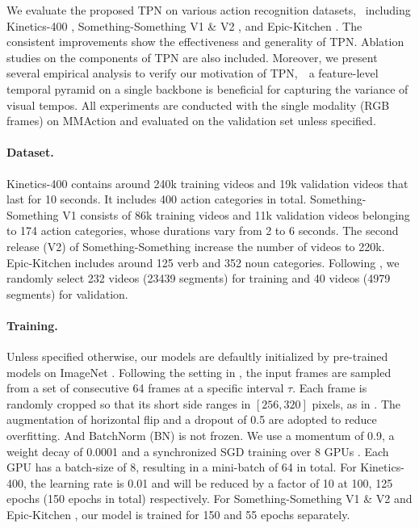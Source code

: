 \documentclass[10pt,twocolumn,letterpaper]{article}
\begin{document}
We evaluate the proposed TPN on various action recognition datasets, \
including Kinetics-400 \cite{kinetics}, Something-Something V1 \& V2 \cite{sthv1}, and Epic-Kitchen \cite{epic}. The consistent improvements show the effectiveness and generality of TPN.
Ablation studies on the components of TPN are also included.
Moreover, we present several empirical analysis to verify our motivation of TPN,\
\ie~a feature-level temporal pyramid on a single backbone is beneficial for capturing the variance of visual tempos.
All experiments are conducted with the single modality (\ie RGB frames) on MMAction \cite{mmaction2019} and evaluated on the validation set unless specified.


\paragraph{Dataset.}
Kinetics-400 \cite{kinetics} contains around 240k training videos and 19k validation videos that last for 10 seconds. It includes 400 action categories in total.
Something-Something V1 \cite{sthv1} consists of 86k training videos and 11k validation videos belonging to 174 action categories, whose durations vary from 2 to 6 seconds.
The second release (V2) of Something-Something increase the number of videos to 220k.
Epic-Kitchen \cite{epic} includes around 125 verb and 352 noun categories. Following \cite{anticipation}, we randomly select 232 videos (23439 segments) for training and 40 videos (4979 segments) for validation.

\paragraph{Training.}
Unless specified otherwise, our models are defaultly initialized by pre-trained models on ImageNet \cite{imagenet}.
Following the setting in \cite{slowfast}, the input frames are sampled from a set of consecutive 64 frames at a specific interval $\tau$.
Each frame is randomly cropped so that its short side ranges in $\left[256, 320\right]$ pixels, as in \cite{nonlocal,slowfast,vggnet}.
The augmentation of horizontal flip and a dropout \cite{dropout} of 0.5 are adopted to reduce overfitting.
And BatchNorm (BN) \cite{bn} is not frozen.
We use a momentum of 0.9, a weight decay of 0.0001 and a synchronized SGD training over 8 GPUs \cite{sgd1hour}.
Each GPU has a batch-size of 8, resulting in a mini-batch of 64 in total.
For Kinetics-400, the learning rate is 0.01 and will be reduced by a factor of 10 at 100, 125 epochs (150 epochs in total) respectively.
For Something-Something V1 \& V2 \cite{sthv1} and Epic-Kitchen \cite{epic}, our model is trained for 150 and 55 epochs separately. 
\end{document}
